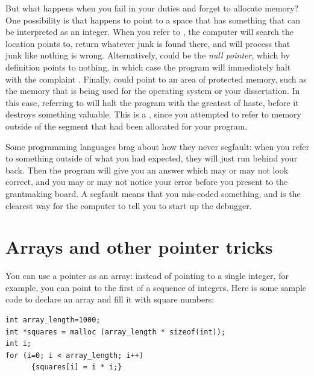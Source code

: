 But what happens when you fail in your duties and forget to allocate
memory? One possibility is that  happens to point to a space
that has something that can be interpreted as an integer. When you refer
to , the computer will search the location 
points to, return whatever junk is found there, and will process that
junk like nothing is wrong. Alternatively,  could be the
{\sl null pointer},  which by definition points to nothing, in which
case the program will immediately halt with the complaint . Finally,  could point to an area of
protected memory, such as the memory that is being used for the operating
system or your dissertation. In this case, referring to  will
halt the program with the greatest of haste, before it destroys something
valuable. This is a , since you attempted to refer
to memory outside of the segment that had been allocated for your program.

Some programming languages brag about how they never segfault: when you
refer to something outside of what you had expected, they will just run
 behind your back. Then the program will give you an answer
which may or may not look correct, and you may or may not notice your
error before you present to the grantmaking board.  A segfault means
that you mis-coded something, and is the clearest way for the computer
to tell you to start up the debugger.


\section{Arrays and other pointer tricks} \label{for_loops} 
You can use a pointer as an array: instead of pointing to a single
integer, for example, you can point to the first of a sequence of
integers. Here is some sample code to declare an array and fill it with square numbers:
\begin{lstlisting}
int array_length=1000;
int *squares = malloc (array_length * sizeof(int));
int i;
for (i=0; i < array_length; i++)
      {squares[i] = i * i;}
\end{lstlisting}

